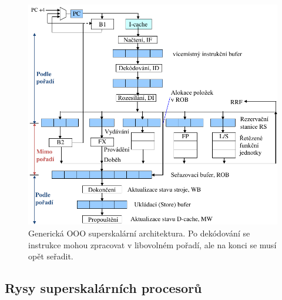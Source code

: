 \begin{compactitem}
    \begin{figure}[H]
        \centering
        \includegraphics[width=1\linewidth]{ooo.pdf}
        \caption{Generická OOO superskalární architektura. Po dekódování se instrukce mohou zpracovat v libovolném pořadí, ale na konci se musí opět seřadit.}
    \end{figure}
\end{compactitem}

\subsection{Rysy superskalárních procesorů}


